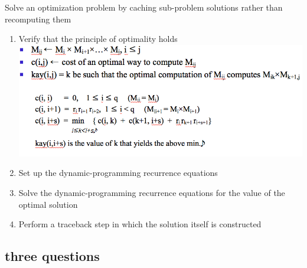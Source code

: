 \documentclass[a4paper,11pt,twoside]{book}
\begin{document}
\begin{itemize}
	Solve an optimization problem by caching  sub-problem solutions rather than recomputing them
	
	\begin{enumerate}
		\item Verify that the principle of optimality holds  \newline
		\includegraphics[scale=0.45]{pics/Recurrence.png} \newline
		
		\item Set up the dynamic-programming recurrence equations
		\item Solve the dynamic-programming recurrence equations for the value of the optimal solution
		\item Perform a traceback step in which the solution itself is constructed
	\end{enumerate}
	
\end{itemize}


\subsection{three questions}
\end{document}
